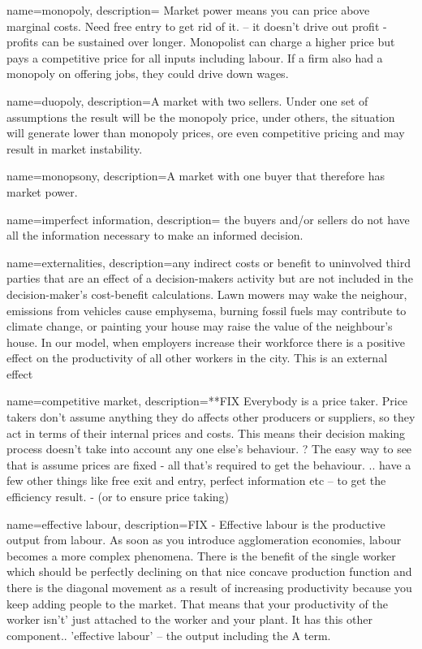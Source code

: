 {
name=monopoly,
description={ Market power means you can price above marginal costs. Need free entry to get rid of it. -- it doesn't drive out profit - profits can be sustained over longer. Monopolist can charge a higher price but pays a competitive price for all \glspl{input} including labour. If a firm also had a monopoly on offering jobs, they could drive down wages.}
}

{
name=duopoly,
description={A market with two sellers. Under one set of assumptions the result will be the monopoly price, under others, the situation will generate lower  than monopoly prices, ore even competitive pricing and may result in market instability.}
}

{
name=monopsony,
description={A market with one buyer that therefore has market power.}
}

{
name=imperfect information,
description={ the buyers and/or sellers do not have all the information necessary to make an informed decision.}
}

{
name=externalities,
description={any indirect costs or benefit to uninvolved third parties that are an effect of a decision-makers activity but are not included in the decision-maker's cost-benefit calculations. Lawn mowers may wake the neighour, emissions from vehicles cause emphysema, burning fossil fuels may contribute to climate change, or painting your house may raise the value of the neighbour's house. In our model, when employers increase their workforce there is a positive effect on the productivity of all other workers in the city. This is an external effect}
}

{
name=competitive market,
description={**FIX Everybody is a price taker. Price takers don't assume anything they do affects other producers or suppliers, so they act in terms of their internal prices and costs. 
This means their decision making process doesn't take into account any one else's behaviour.
? The easy way to see that is assume prices are fixed - all that's required to get the behaviour. ..  have a few other things like free exit and entry, perfect information etc -- to get the efficiency result. - (or to ensure price taking)}
}

{
name=effective labour,
description={FIX - Effective labour is the productive \gls{output} from labour. As soon as you introduce agglomeration economies, labour becomes a more complex phenomena. There is the benefit of the single worker which should be perfectly declining on that nice concave production function and there is the diagonal movement as a result of increasing productivity because you keep adding people to the market. That means that your productivity of the worker isn't' just attached to the worker and your plant. It has this other component.. 'effective labour' -- the output including the A term.}
}

